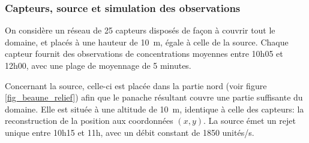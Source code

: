 \subsubsection{Capteurs, source et simulation des observations}
On considère un réseau de 25 capteurs disposés de façon à couvrir tout le domaine, et placés à une hauteur de \SI{10}{\meter}, égale à celle de la source. Chaque capteur fournit des observations de concentrations moyennes entre 10h05 et 12h00, avec une plage de moyennage de 5 minutes.

Concernant la source, celle-ci est placée dans la partie nord (voir figure \ref{fig_beaune_relief}) afin que le panache résultant couvre une partie suffisante du domaine. Elle est située à une altitude de \SI{10}{\m}, identique à celle des capteurs:  la reconstruction de la position aux coordonnées $(x,y)$. La source émet un rejet unique entre 10h15 et 11h, avec un débit constant de 1850 unités/s. \\



